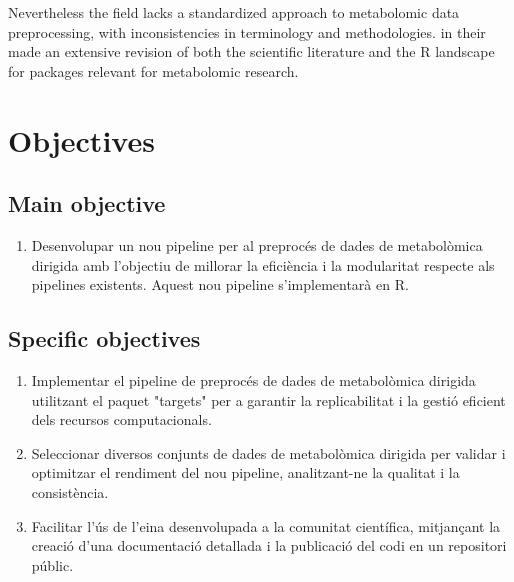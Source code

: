 \documentclass[ENG, BIB]{TFUOC}%
\begin{document}
Nevertheless the field lacks a standardized approach to metabolomic data preprocessing, with inconsistencies in terminology and methodologies. 
\citeauthor{stanstrupMetaRbolomicsToolboxBioconductor2019} in their  made an extensive revision of both the scientific literature and the R landscape for packages relevant for metabolomic research.









\chapter{Objectives} 

\section{Main objective}
\begin{enumerate}
    \item Desenvolupar un nou pipeline per al preprocés de dades de metabolòmica dirigida amb l'objectiu de millorar la eficiència i la modularitat respecte als pipelines existents. Aquest nou pipeline s'implementarà en R. 
\end{enumerate}

\section{Specific objectives}

\begin{enumerate}
    \item Implementar el pipeline de preprocés de dades de metabolòmica dirigida utilitzant el paquet "targets" per a garantir la replicabilitat i la gestió eficient dels recursos computacionals.
    \item Seleccionar diversos conjunts de dades de metabolòmica dirigida per validar i optimitzar el rendiment del nou pipeline, analitzant-ne la qualitat i la consistència.
    \item Facilitar l'ús de l'eina desenvolupada a la comunitat científica, mitjançant la creació d'una documentació detallada i la publicació del codi en un repositori públic.
\end{enumerate}
\end{document}
